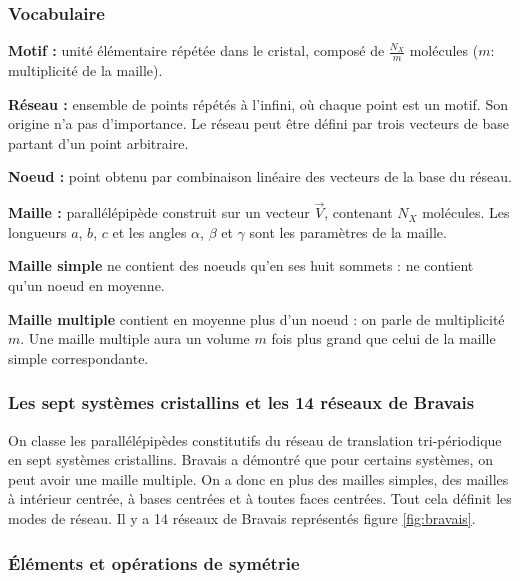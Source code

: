 \documentclass{article}
\begin{document}
\subsubsection{Vocabulaire}\label{subsec:vocabulaire}

\noindent\textbf{Motif :} unité élémentaire répétée dans le cristal, composé de $\frac{N_X}{m}$ molécules ($m$: multiplicité de la maille).

\noindent\textbf{Réseau :} ensemble de points répétés à l'infini, où chaque point est un motif. Son origine n'a pas d'importance.
Le réseau peut être défini par trois vecteurs de base partant d'un point arbitraire.

\noindent\textbf{Noeud :} point obtenu par combinaison linéaire des vecteurs de la base du réseau.

\noindent\textbf{Maille :} parallélépipède construit sur un vecteur $\vec V$, contenant $N_X$ molécules.
Les longueurs $a$, $b$, $c$ et les angles $\alpha$, $\beta$ et $\gamma$ sont les paramètres de la maille.

\noindent\textbf{Maille simple} ne contient des noeuds qu'en ses huit sommets : ne contient qu'un noeud en moyenne.

\noindent\textbf{Maille multiple} contient en moyenne plus d'un noeud : on parle de multiplicité $m$.
Une maille multiple aura un volume $m$ fois plus grand que celui de la maille simple correspondante.


\subsubsection{Les sept systèmes cristallins et les 14 réseaux de Bravais}\label{subsec:les-sept-systemes-cristallins-et-les-14-reseaux-de-bravais}

On classe les parallélépipèdes constitutifs du réseau de translation tri-périodique en sept systèmes cristallins.
Bravais a démontré que pour certains systèmes, on peut avoir une maille multiple.
On a donc en plus des mailles simples, des mailles à intérieur centrée, à bases centrées et à toutes faces centrées.
Tout cela définit les modes de réseau.
Il y a 14 réseaux de Bravais représentés figure \ref{fig:bravais}.

\vspace{0.4cm}
\subsubsection{Éléments et opérations de symétrie}\label{subsec:elements-et-operations-de-symetrie}
\end{document}
